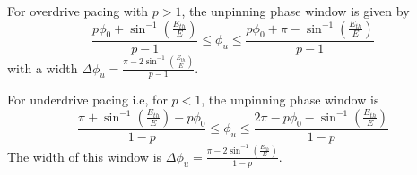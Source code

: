 \documentclass[%
 preprint,
 amsmath,amssymb,
 aps,
]{revtex4-2}
\begin{document}
For overdrive pacing with $p>1$, the unpinning phase window is given by
\begin{equation}
\frac{p \phi_0+ {\sin^{-1}}(\frac{E_{th}}{E})}{p-1}   \leq \phi_u \leq \frac{p \phi_0+\pi -{\sin^{-1}}(\frac{E_{th}}{E})}{p-1}
\label{eq:overdrive}
\end{equation}
with a width $\Delta\phi_u = \frac{\pi - 2 \sin^{-1}(\frac{E_{th}}{E})}{p-1}$.

For underdrive pacing i.e, for $p<1$, the unpinning phase window is 
\begin{equation}
\frac{\pi+ {\sin^{-1}}(\frac{E_{th}}{E})-p \phi_0}{1-p}   \leq \phi_u \leq \frac{2\pi-p \phi_0-{\sin^{-1}}(\frac{E_{th}}{E})}{1-p}
\label{eq:underdrive}
\end{equation}
The width of this window is $\Delta\phi_u = \frac{\pi - 2 \sin^{-1}(\frac{E_{th}}{E})}{1-p}$.



\end{document}
